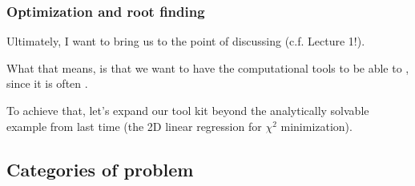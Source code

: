 \documentclass[hyperref={colorlinks=true}]{beamer}
\begin{document}

\begin{frame}%
  \frametitle{Optimization and root finding}

  Ultimately, I want to bring us to the point of discussing  (c.f. Lecture 1!). 
  
  \vspace{0.4cm}
  
  What that means, is that we want to have the computational tools to be able to , since it is often .
  
  \vspace{0.4cm}
  
  To achieve that, let's expand our tool kit beyond the analytically solvable example from last time (the 2D linear regression for $\chi^2$ minimization).

\end{frame}

\subsection[Categories of problem]{Categories of problem}
\end{document}
